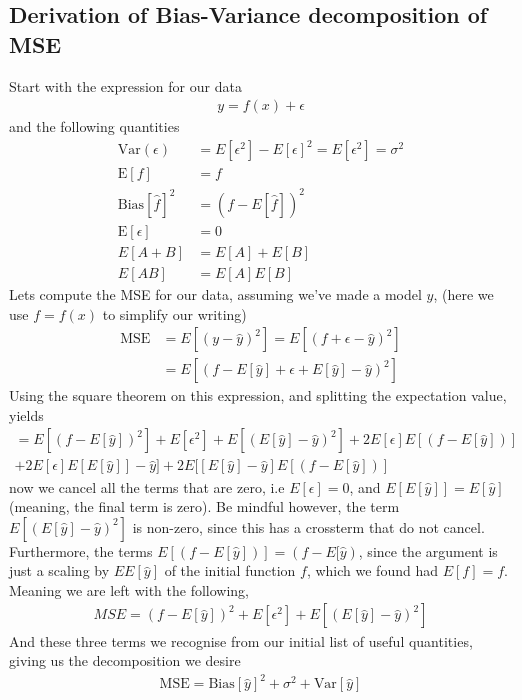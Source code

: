 \documentclass[../main.tex]{subfiles}
\begin{document}
\subsection{Derivation of Bias-Variance decomposition of MSE}\label{app:MSE_bias_var}
Start with the expression for our data
\begin{align*}
    y = f(x) + \epsilon
\end{align*}
and the following quantities
\begin{align*}
    \text{Var}(\epsilon) &= E[\epsilon^2] - E[\epsilon]^2 = E[\epsilon^2] =  \sigma^2 \\
    \text{E}[f] &= f \\ 
    \text{Bias}[\hat f]^2 &= (f - E[\hat f])^2 \\
    \text{E}[\epsilon] &= 0 \\
    E[A + B] &= E[A] + E[B] \\
    E[AB] &= E[A]E[B]
\end{align*}
Lets compute the MSE for our data, assuming we've made a model $\hat y$, (here we use $f = f(x)$ to simplify our writing)
\begin{align*}
    \text{MSE} &= E[(y-\hat y)^2] = E[(f + \epsilon - \hat y)^2] \\ 
    &= E[(f - E[\hat y] + \epsilon + E[\hat y] - \hat y )^2] 
\end{align*}
Using the square theorem on this expression, and splitting the expectation value,  yields
\begin{align*}
    = E[(f-E[\hat y])^2] + E[\epsilon^2] + E[(E[\hat y] - \hat y)^2] + 2E[\epsilon]E[(f-E[\hat y])] \\ + 2E[\epsilon]E[E[\hat y]] - \hat y] + 2E[[E[\hat y] - \hat y ]E[(f-E[\hat y])]
\end{align*}
now we cancel all the terms that are zero, i.e $E[\epsilon] = 0$, and $E[E[\hat y]] = E[\hat y]$ (meaning, the final term is zero). Be mindful however, the term $E[(E[\hat y] - \hat y)^2]$ is non-zero, since this has a crossterm that do not cancel. Furthermore, the terms $E[(f-E[\hat y])] = (f - E[\hat y)$, since the argument is just a scaling by $EE[\hat y]$ of the initial function $f$, which we found had $E[f] = f$.
Meaning we are left with the following,
\begin{align*}
   MSE =  (f - E[\hat y])^2 + E[\epsilon^2] + E[(E[\hat y] - \hat y)^2]
\end{align*}
And these three terms we recognise from our initial list of useful quantities, giving us the decomposition we desire
\begin{align}\label{app:bias_variance_decomp}
    \text{MSE} = \text{Bias}[\hat y]^2 + \sigma^2 + \text{Var}[\hat y]
\end{align}
\end{document}
